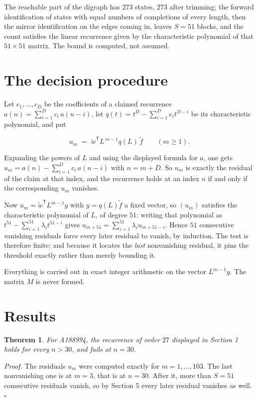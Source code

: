 \documentclass[11pt]{article}
\newtheorem{theorem}{Theorem}
\theoremstyle{definition}
\begin{document}
The reachable part of the digraph has $273$ states, $273$ after trimming; the forward identification of states with equal numbers of completions of every length, then the mirror identification on the edges coming in, leaves $S = 51$ blocks, and the count satisfies the linear recurrence given by the characteristic polynomial of that $51\times51$ matrix. The bound is computed, not assumed.

\section{The decision procedure}

Let $c_1,\dots,c_D$ be the coefficients of a claimed recurrence $a(n) = \sum_{i=1}^{D} c_i\,a(n-i)$, let $q(t) = t^{D} - \sum_{i=1}^{D} c_i t^{D-i}$ be its characteristic polynomial, and put

\[u_m \;=\; \tilde w^{\mathsf T} L^{\,m-1} q(L)\,\tilde f \qquad (m \ge 1).\]

Expanding the powers of $L$ and using the displayed formula for $a$, one gets $u_m = a(n) - \sum_{i=1}^{D} c_i\,a(n-i)$ with $n = m + D$. So $u_m$ is exactly the residual of the claim at that index, and the recurrence holds at an index $n$ if and only if the corresponding $u_m$ vanishes.

Now $u_m = \tilde w^{\mathsf T} L^{m-1} y$ with $y = q(L)\tilde f$ a fixed vector, so $(u_m)$ satisfies the characteristic polynomial of $L$, of degree $51$: writing that polynomial as $t^{51} - \sum_{i=1}^{51} \lambda_i t^{51-i}$ gives $u_{m+51} = \sum_{i=1}^{51} \lambda_i u_{m+51-i}$. Hence $51$ consecutive vanishing residuals force every later residual to vanish, by induction. The test is therefore finite; and because it locates the {\itshape last} nonvanishing residual, it pins the threshold exactly rather than merely bounding it.

Everything is carried out in exact integer arithmetic on the vector $L^{m-1}y$. The matrix $M$ is never formed.

\section{Results}

\begin{theorem} For A188994, the recurrence of order $27$ displayed in Section 1 holds for every $n > 30$, and fails at $n = 30$.\end{theorem}

{\itshape Proof.} The residuals $u_m$ were computed exactly for $m = 1,\dots,103$. The last nonvanishing one is at $m = 3$, that is at $n = 30$. After it, more than $S = 51$ consecutive residuals vanish, so by Section 5 every later residual vanishes as well. $\square$
\end{document}
